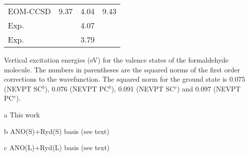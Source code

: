\begin{center}
\begin{threeparttable}
\begin{tabular*}{0.80\textwidth}{l@{\hspace*{20mm}}ccc}
EOM-CCSD \cite{jpca-106-4192-2002}&  9.37  & 4.04  & 9.43  \\
Exp. \cite{robin-hespm}      &        & 4.07  &       \\
Exp. \cite{jcp-87-3796-1987}      &        & 3.79  &       \\
\hline
\end{tabular*}
\caption{\footnotesize Vertical excitation energies (eV) for the valence states of
the formaldehyde molecule.  The numbers in parentheses are the squared norms
of the first order corrections to the wavefunction. The squared norm for
the ground state is 0.075 (NEVPT SC$^b$), 0.076 (NEVPT PC$^b$), 0.091
(NEVPT SC$^c$) and 0.097 (NEVPT PC$^c$).}
\label{tbl:form_exc_val}
\begin{tablenotes}
\footnotesize
\item[a] This work
\item[b] ANO(S)+Ryd(S) basis (see text)
\item[c] ANO(L)+Ryd(L) basis (see text)
\end{tablenotes}
\end{threeparttable}
\end{center}
